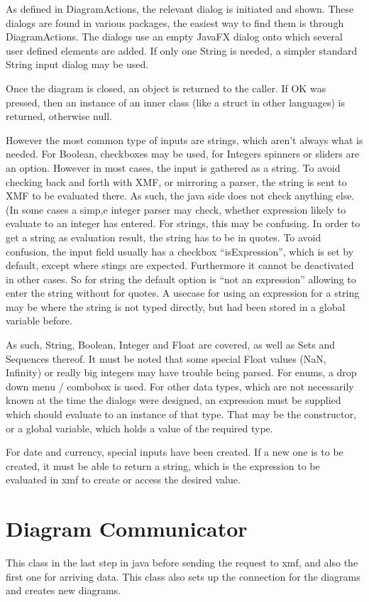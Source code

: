 \documentclass [11pt,letterpaper,twoside,openright]{book}
\begin{document}
As defined in DiagramActions, the relevant dialog is initiated and shown. These dialogs are found in various packages, the easiest way to find them is through DiagramActions. The dialogs use an empty JavaFX dialog onto which several user defined elements are added. If only one String is needed, a simpler standard String input dialog may be used.

Once the diagram is closed, an object is returned to the caller. If OK was pressed, then an instance of an inner class (like a struct in other languages) is returned, otherwise null. 

However the most common type of inputs are strings, which aren't always what is needed. For Boolean, checkboxes may be used, for Integers spinners or sliders are an option. However in most cases, the input is gathered as a string. To avoid checking back and forth with XMF, or mirroring a parser, the string is sent to XMF to be evaluated there. As such, the java side does not check anything else. (In some cases a simp,e integer parser may check, whether expression likely to evaluate to an integer has entered. For strings, this may be confusing. In order to get a string as evaluation result, the string has to be in quotes. To avoid confusion, the input field usually has a checkbox ``isExpression'', which is set by default, except where stings are expected. Furthermore it cannot be deactivated in other cases. So for string the default option is ``not an expression'' allowing to enter the string without for quotes. A usecase for using an expression for a string may be where the string is not typed directly, but had been stored in a global variable before.

As such, String, Boolean, Integer and Float are covered, as well as Sets and Sequences thereof. It must be noted that some special Float values (NaN, Infinity) or really big integers may have trouble being parsed. For enums, a drop down menu / combobox is used. For other data types, which are not necessarily known at the time the dialogs were designed, an expression must be supplied which should evaluate to an instance of that type. That may be the constructor, or a global variable, which holds a value of the required type.

For date and currency, special inputs have been created. If a new one is to be created, it must be able to return a string, which is the expression to be evaluated in xmf to create or access the desired value.

\section{Diagram Communicator}
This class in the last step in java before sending the request to xmf, and also the first one for arriving data. 
This class also sets up the connection for the diagrams and creates new diagrams. 
\end{document}
